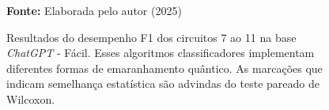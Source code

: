 \begin{figure}
\caption{Resultados do desempenho F1 dos circuitos 7 ao 11 na base \textit{ChatGPT} - Fácil. Esses algoritmos classificadores implementam diferentes formas de emaranhamento quântico. As marcações que indicam semelhança estatística são advindas do teste pareado de Wilcoxon.}
\label{fig:f1:easy:g2}
     \centering
    \centering

      \par\medskip\ABNTEXfontereduzida\selectfont\textbf{Fonte:} Elaborada pelo autor (2025) \par\medskip
\end{figure}